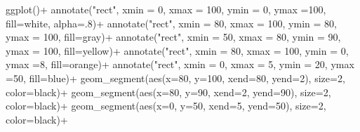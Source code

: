 \documentclass[
  letterpaper,
  DIV=11,
  numbers=noendperiod]{scrreprt}
\newenvironment{Shaded}{\begin{snugshade}}{\end{snugshade}}
\newcommand{\AttributeTok}[1]{\textcolor[rgb]{0.40,0.45,0.13}{#1}}
\newcommand{\DecValTok}[1]{\textcolor[rgb]{0.68,0.00,0.00}{#1}}
\newcommand{\FunctionTok}[1]{\textcolor[rgb]{0.28,0.35,0.67}{#1}}
\newcommand{\NormalTok}[1]{\textcolor[rgb]{0.00,0.23,0.31}{#1}}
\newcommand{\SpecialCharTok}[1]{\textcolor[rgb]{0.37,0.37,0.37}{#1}}
\newcommand{\StringTok}[1]{\textcolor[rgb]{0.13,0.47,0.30}{#1}}
\begin{document}
\begin{Shaded}
\begin{Highlighting}[]
\FunctionTok{ggplot}\NormalTok{()}\SpecialCharTok{+}
  \FunctionTok{annotate}\NormalTok{(}\StringTok{"rect"}\NormalTok{, }\AttributeTok{xmin =} \DecValTok{0}\NormalTok{, }\AttributeTok{xmax =} \DecValTok{100}\NormalTok{, }\AttributeTok{ymin =} \DecValTok{0}\NormalTok{, }\AttributeTok{ymax =}\DecValTok{100}\NormalTok{, }\AttributeTok{fill=}\NormalTok{white, }\AttributeTok{alpha=}\NormalTok{.}\DecValTok{8}\NormalTok{)}\SpecialCharTok{+}
  \FunctionTok{annotate}\NormalTok{(}\StringTok{"rect"}\NormalTok{, }\AttributeTok{xmin =} \DecValTok{80}\NormalTok{, }\AttributeTok{xmax =} \DecValTok{100}\NormalTok{, }\AttributeTok{ymin =} \DecValTok{80}\NormalTok{, }\AttributeTok{ymax =} \DecValTok{100}\NormalTok{, }\AttributeTok{fill=}\NormalTok{gray)}\SpecialCharTok{+}
  \FunctionTok{annotate}\NormalTok{(}\StringTok{"rect"}\NormalTok{, }\AttributeTok{xmin =} \DecValTok{50}\NormalTok{, }\AttributeTok{xmax =} \DecValTok{80}\NormalTok{, }\AttributeTok{ymin =} \DecValTok{90}\NormalTok{, }\AttributeTok{ymax =} \DecValTok{100}\NormalTok{, }\AttributeTok{fill=}\NormalTok{yellow)}\SpecialCharTok{+}
  \FunctionTok{annotate}\NormalTok{(}\StringTok{"rect"}\NormalTok{, }\AttributeTok{xmin =} \DecValTok{80}\NormalTok{, }\AttributeTok{xmax =} \DecValTok{100}\NormalTok{, }\AttributeTok{ymin =} \DecValTok{0}\NormalTok{, }\AttributeTok{ymax =}\DecValTok{8}\NormalTok{, }\AttributeTok{fill=}\NormalTok{orange)}\SpecialCharTok{+}
  \FunctionTok{annotate}\NormalTok{(}\StringTok{"rect"}\NormalTok{, }\AttributeTok{xmin =} \DecValTok{0}\NormalTok{, }\AttributeTok{xmax =} \DecValTok{5}\NormalTok{, }\AttributeTok{ymin =} \DecValTok{20}\NormalTok{, }\AttributeTok{ymax =}\DecValTok{50}\NormalTok{, }\AttributeTok{fill=}\NormalTok{blue)}\SpecialCharTok{+}
  \FunctionTok{geom\_segment}\NormalTok{(}\FunctionTok{aes}\NormalTok{(}\AttributeTok{x=}\DecValTok{80}\NormalTok{, }\AttributeTok{y=}\DecValTok{100}\NormalTok{, }\AttributeTok{xend=}\DecValTok{80}\NormalTok{, }\AttributeTok{yend=}\DecValTok{2}\NormalTok{), }\AttributeTok{size=}\DecValTok{2}\NormalTok{, }\AttributeTok{color=}\NormalTok{black)}\SpecialCharTok{+}
  \FunctionTok{geom\_segment}\NormalTok{(}\FunctionTok{aes}\NormalTok{(}\AttributeTok{x=}\DecValTok{80}\NormalTok{, }\AttributeTok{y=}\DecValTok{90}\NormalTok{, }\AttributeTok{xend=}\DecValTok{2}\NormalTok{, }\AttributeTok{yend=}\DecValTok{90}\NormalTok{), }\AttributeTok{size=}\DecValTok{2}\NormalTok{, }\AttributeTok{color=}\NormalTok{black)}\SpecialCharTok{+}
  \FunctionTok{geom\_segment}\NormalTok{(}\FunctionTok{aes}\NormalTok{(}\AttributeTok{x=}\DecValTok{0}\NormalTok{, }\AttributeTok{y=}\DecValTok{50}\NormalTok{, }\AttributeTok{xend=}\DecValTok{5}\NormalTok{, }\AttributeTok{yend=}\DecValTok{50}\NormalTok{), }\AttributeTok{size=}\DecValTok{2}\NormalTok{, }\AttributeTok{color=}\NormalTok{black)}\SpecialCharTok{+}

\end{Highlighting}
\end{Shaded}
\end{document}
